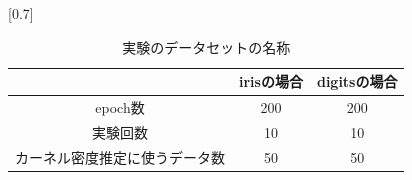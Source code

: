 \begin{table}[htbp]
    \begin{center}
        \caption{実験のデータセットの名称}
        \vspace{5mm} 
        \scalebox{0.7}[0.7]{
            \begin{tabular}{||c | c |c||}
              & irisの場合 & digitsの場合 \\
            \hline
            epoch数                           & 200       & 200  \\
            実験回数                           & 10     & 10 \\
            カーネル密度推定に使うデータ数        & 50           & 50  \\
            \end{tabular}
        }
    \end{center}
\end{table}










